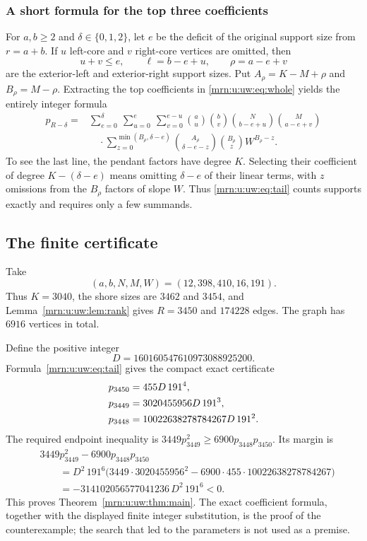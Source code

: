 \documentclass[11pt,a4paper]{article}
\theoremstyle{remark}\newtheorem{remark}[theorem]{Remark}
\begin{document}
\subsubsection{A short formula for the top three coefficients}
For $a,b\ge2$ and $\delta\in\{0,1,2\}$, let $e$ be the deficit of the original support size from $r=a+b$. If $u$ left-core and $v$ right-core vertices are omitted, then
\[
 u+v\le e,\qquad
 \ell=b-e+u,\qquad \rho=a-e+v
\]
are the exterior-left and exterior-right support sizes. Put
$A_\rho=K-M+\rho$ and $B_\rho=M-\rho$.
Extracting the top coefficients in \eqref{mrn:u:uw:eq:whole} yields the entirely integer formula
\begin{equation}\label{mrn:u:uw:eq:tail}
\begin{split}
 p_{R-\delta}={}&
 \sum_{e=0}^{\delta}\ \sum_{u=0}^{e}\ \sum_{v=0}^{e-u}
 \binom au\binom bv\binom N{b-e+u}\binom M{a-e+v}\\
 &\quad\cdot
 \sum_{z=0}^{\min(B_\rho,\delta-e)}
 \binom{A_\rho}{\delta-e-z}\binom{B_\rho}{z}W^{B_\rho-z}.
\end{split}
\end{equation}
To see the last line, the pendant factors have degree $K$. Selecting their coefficient of degree $K-(\delta-e)$ means omitting $\delta-e$ of their linear terms, with $z$ omissions from the $B_\rho$ factors of slope $W$. Thus \eqref{mrn:u:uw:eq:tail} counts supports exactly and requires only a few summands.

\subsection{The finite certificate}
Take
\[
 (a,b,N,M,W)=(12,398,410,16,191).
\]
Thus $K=3040$, the shore sizes are $3462$ and $3454$, and Lemma~\ref{mrn:u:uw:lem:rank} gives $R=3450$ and $174228$ edges. The graph has $6916$ vertices in total.

Define the positive integer
\[
 D=160160547610973088925200.
\]
Formula~\eqref{mrn:u:uw:eq:tail} gives the compact exact certificate
\begin{align}
 p_{3450}&=455D\,191^4,\notag\\
 p_{3449}&=3020455956D\,191^3,\label{mrn:u:uw:eq:certificate}\\
 p_{3448}&=10022638278784267D\,191^2.\notag
\end{align}
The required endpoint inequality is
$3449p_{3449}^2\ge6900p_{3448}p_{3450}$. Its margin is
\begin{align*}
 &3449p_{3449}^2-6900p_{3448}p_{3450}\\
 &\qquad=D^2\,191^6
 \bigl(3449\cdot3020455956^2
       -6900\cdot455\cdot10022638278784267\bigr)\\
 &\qquad=-314102056577041236\,D^2\,191^6<0.
\end{align*}
This proves Theorem~\ref{mrn:u:uw:thm:main}. The exact coefficient formula, together with the displayed finite integer substitution, is the proof of the counterexample; the search that led to the parameters is not used as a premise.
\end{document}
